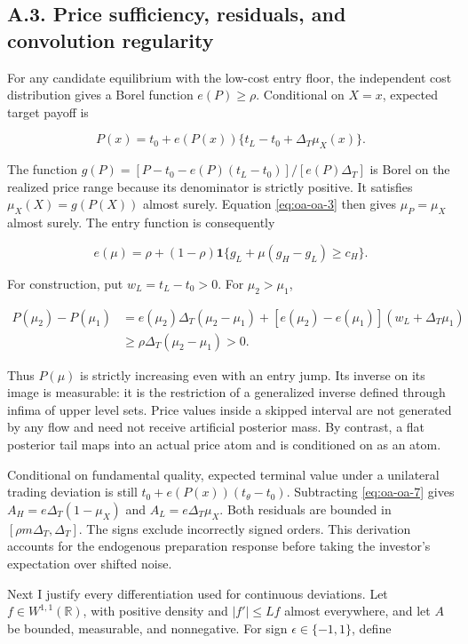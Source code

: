 \documentclass[
  11pt,
]{article}
\begin{document}
\subsection{A.3. Price sufficiency, residuals, and convolution
regularity}\label{oa-a-inference}

For any candidate equilibrium with the low-cost entry floor, the
independent cost distribution gives a Borel function \(e(P)\ge\rho\).
Conditional on \(X=x\), expected target payoff is

\[
P(x)=t_0+e(P(x))\{t_L-t_0+\Delta_T\mu_X(x)\}.
\tag{OA.7}\label{eq:oa-oa-7}
\]

The function \(g(P)=[P-t_0-e(P)(t_L-t_0)]/[e(P)\Delta_T]\) is Borel on
the realized price range because its denominator is strictly positive.
It satisfies \(\mu_X(X)=g(P(X))\) almost surely. Equation
\eqref{eq:oa-oa-3} then gives \(\mu_P=\mu_X\) almost surely. The entry
function is consequently

\[
e(\mu)=\rho+(1-\rho)\mathbf1\{g_L+\mu(g_H-g_L)\ge c_H\}.
\tag{OA.8}\label{eq:oa-oa-8}
\]

For construction, put \(w_L=t_L-t_0>0\). For \(\mu_2>\mu_1\),

\[
\begin{aligned}
P(\mu_2)-P(\mu_1)
&=e(\mu_2)\Delta_T(\mu_2-\mu_1)
+[e(\mu_2)-e(\mu_1)](w_L+\Delta_T\mu_1)\\
&\ge\rho\Delta_T(\mu_2-\mu_1)>0.
\end{aligned}
\tag{OA.9}\label{eq:oa-oa-9}
\]

Thus \(P(\mu)\) is strictly increasing even with an entry jump. Its
inverse on its image is measurable: it is the restriction of a
generalized inverse defined through infima of upper level sets. Price
values inside a skipped interval are not generated by any flow and need
not receive artificial posterior mass. By contrast, a flat posterior
tail maps into an actual price atom and is conditioned on as an atom.

Conditional on fundamental quality, expected terminal value under a
unilateral trading deviation is still \(t_0+e(P(x))(t_\theta-t_0)\).
Subtracting \eqref{eq:oa-oa-7} gives \(A_H=e\Delta_T(1-\mu_X)\) and
\(A_L=e\Delta_T\mu_X\). Both residuals are bounded in
\([\rho m\Delta_T,\Delta_T]\). The signs exclude incorrectly signed
orders. This derivation accounts for the endogenous preparation response
before taking the investor's expectation over shifted noise.

Next I justify every differentiation used for continuous deviations. Let
\(f\in W^{1,1}(\mathbb R)\), with positive density and \(|f'|\le Lf\)
almost everywhere, and let \(A\) be bounded, measurable, and
nonnegative. For sign \(\epsilon\in\{-1,1\}\), define
\end{document}
